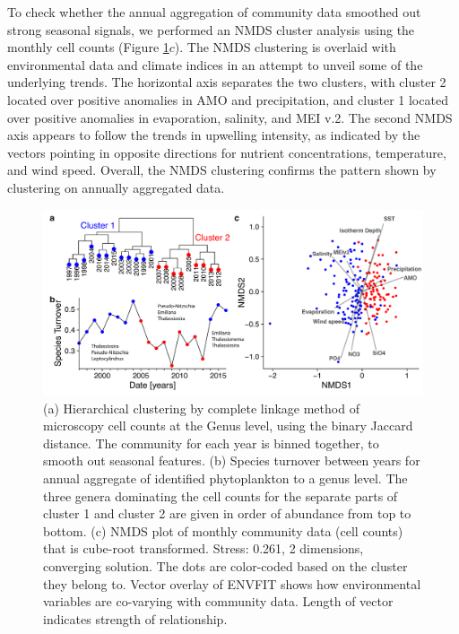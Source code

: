 \documentclass[draft]{agujournal2019}
\begin{document}
To check whether the annual aggregation of community data smoothed out strong seasonal signals, we performed an NMDS cluster analysis using the monthly cell counts (Figure \ref{fig:clustering}$c$). The NMDS clustering is overlaid with environmental data and climate indices in an attempt to unveil some of the underlying trends. The horizontal axis separates the two clusters, with cluster 2 located over positive anomalies in AMO and precipitation, and cluster 1 located over positive anomalies in evaporation, salinity, and MEI v.2. The second NMDS axis appears to follow the trends in upwelling intensity, as indicated by the vectors pointing in opposite directions for nutrient concentrations, temperature, and wind speed. Overall, the NMDS clustering confirms the pattern shown by clustering on annually aggregated data. 

\begin{figure}
\noindent\includegraphics[width=\textwidth]{fig/Figure4_ClusteringNMDS_v2.pdf}
\caption{(a) Hierarchical clustering by complete linkage method of microscopy cell counts at the Genus level, using the binary Jaccard distance. The community for each year is binned together, to smooth out seasonal features. (b) Species turnover between years for annual aggregate of identified phytoplankton to a genus level. The three genera dominating the cell counts for the separate parts of cluster 1 and cluster 2 are given in order of abundance from top to bottom. (c) NMDS plot of monthly community data (cell counts) that is cube-root transformed. Stress: 0.261, 2 dimensions, converging solution. The dots are color-coded based on the cluster they belong to. Vector overlay of ENVFIT shows how environmental variables are co-varying with community data. Length of vector indicates strength of relationship.}
\label{fig:clustering}
\end{figure}
\end{document}

